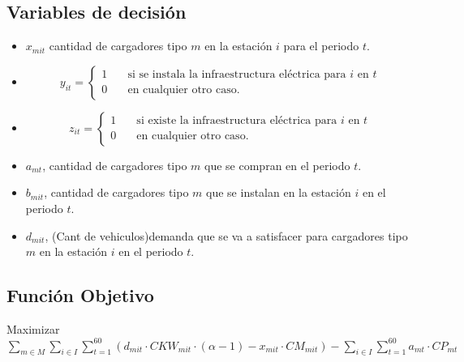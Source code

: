 \documentclass[letterpaper]{article}
\begin{document}
\begin{flushleft}
	\subsection{Variables de decisión}
	\begin{itemize}
		\item $x_{mit}$ cantidad de cargadores tipo $m$ en la estación $i$ para el periodo $t$.
		\item \[
			      y_{it} =
			      \begin{cases}
				      1 & \quad\text{si se instala la infraestructura eléctrica para }i\text{ en }t \\
				      0 & \quad\text{en cualquier otro caso.}
			      \end{cases}
		      \]
		\item \[
			      z_{it} =
			      \begin{cases}
				      1 & \quad\text{si existe la infraestructura eléctrica para }i\text{ en }t \\
				      0 & \quad\text{en cualquier otro caso.}
			      \end{cases}
		      \]
		\item $a_{mt}$, cantidad de cargadores tipo $m$ que se compran en el periodo $t$.
		\item $b_{mit}$, cantidad de cargadores tipo $m$ que se instalan en la estación $i$ en el periodo $t$.
		\item $d_{mit}$, (Cant de vehiculos)demanda que se va a satisfacer para cargadores tipo $m$ en la estación $i$ en el periodo $t$.
	\end{itemize}
	\subsection{Función Objetivo}
	\begin{center}
		Maximizar $\sum_{m \in M}\sum_{i \in I} \sum_{t=1}^{60} (d_{mit} \cdot CKW_{mit} \cdot (\alpha - 1) - x_{mit} \cdot CM_{mit}) - \sum_{i \in I} \sum_{t=1}^{60} a_{mt} \cdot CP_{mt}$
	\end{center}


\end{flushleft}
\end{document}
